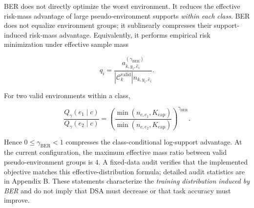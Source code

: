 BER does not directly optimize the worst environment. It reduces the effective risk-mass advantage of large pseudo-environment supports \emph{within each class}. BER does not equalize environment groups; it sublinearly compresses their support-induced risk-mass advantage. Equivalently, it performs empirical risk minimization under effective sample mass

\[
q_i=
\frac{a^{(\gamma_{\mathrm{BER}})}_{k,y_i,\hat e_i}}
{|\mathcal C_k^{\mathrm{valid}}|n_{k,y_i,\hat e_i}}.
\]

For two valid environments within a class,

\[
\frac{Q_\gamma(e_1\mid c)}{Q_\gamma(e_2\mid c)}
=
\left(
\frac{\min(n_{c,e_1},K_{\mathrm{cap}})}
{\min(n_{c,e_2},K_{\mathrm{cap}})}
\right)^{\gamma_{\mathrm{BER}}}.
\]

Hence \(0\le\gamma_{\mathrm{BER}}<1\) compresses the class-conditional log-support advantage. At the current configuration, the maximum effective mass ratio between valid pseudo-environment groups is \(4\). A fixed-data audit verifies that the implemented objective matches this effective-distribution formula; detailed audit statistics are in Appendix B. These statements characterize the \emph{training distribution induced by BER} and do not imply that DSA must decrease or that task accuracy must improve.
